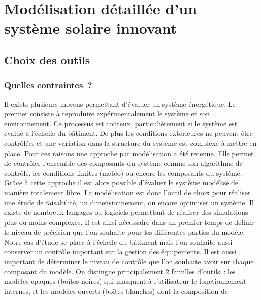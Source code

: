 \section{Modélisation détaillée d’un système solaire innovant} %
\label{sec:modelisation_detaillee_d_un_systeme_solaire_innovant}
\subsection{Choix des outils} %
\label{sub:choix_des_outils}
\subsubsection{Quelles contraintes~?} %
\label{ssub:quelles_contraintes}
Il existe plusieurs moyens permettant d’évaluer un système énergétique. Le premier
consiste à reproduire expérimentalement le système et son environnement. Ce processus est
coûteux, particulièrement si le système est évalué à l’échelle du bâtiment. De plus les
conditions extérieures ne peuvent être contrôlées et une variation dans la structure du
système est complexe à mettre en place. Pour ces raisons une approche par modélisation a
été retenue. Elle permet de contrôler l’ensemble des composants du système comme son
algorithme de contrôle, les conditions limites (météo) ou encore les composants du
système. Grâce à cette approche il est alors possible d’évaluer le système modélisé de
manière totalement libre. La modélisation est donc l’outil de choix pour réaliser une
étude de faisabilité, un dimensionnement, ou encore optimiser un système. Il existe de
nombreux langages ou logiciels permettant de réaliser des simulations plus ou moins
complexes. Il est ainsi nécessaire dans un premier temps de définir le niveau de précision
que l’on souhaite pour les différentes parties du modèle. Notre cas d’étude se place à
l’échelle du bâtiment mais l’on souhaite aussi conserver un contrôle important sur la
gestion des équipements. Il est aussi important de déterminer le niveau de contrôle que
l’on souhaite avoir sur chaque composant du modèle. On distingue principalement 2 familles
d’outils~: les modèles opaques (boîtes noires) qui masquent à l’utilisateur le
fonctionnement internes, et les modèles ouverts (boîtes blanches) dont la composition de
